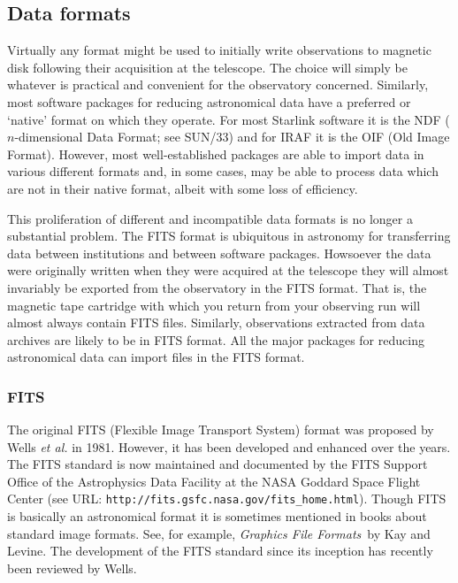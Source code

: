 \documentclass[twoside,11pt]{article}
\newcommand{\htmladdnormallink}[2]{#1}
\newcommand{\xref}[3]{#1}
\newcommand{\xlabel}[1]{}
\begin{document}
\subsection{\label{FORMAT}Data formats}

Virtually any format might be used to initially write observations to
magnetic disk following their acquisition at the telescope.  The choice
will simply be whatever is practical and convenient for the observatory
concerned.  Similarly, most software packages for reducing astronomical
data have a preferred or `native' format on which they operate.  For most
Starlink software it is the NDF ($n$-dimensional Data Format; see
\xref{SUN/33}{sun33}{}\cite{SUN33}) and for IRAF it is the OIF (Old
Image Format).  However, most well-established packages are able to
import data in various different formats and, in some cases, may be able
to process data which are not in their native format, albeit with some loss
of efficiency.

This proliferation of different and incompatible data formats is no longer
a substantial problem.  The FITS format is ubiquitous in astronomy for
transferring data between institutions and between software packages.
Howsoever the data were originally written when they were acquired at the
telescope they will almost invariably be exported from the observatory in
the FITS format.  That is, the magnetic tape cartridge with which you return
from your observing run will almost always contain FITS files.  Similarly,
observations extracted from
\htmladdnormallink{data archives}{http://www.starlink.ac.uk/archives/}
are likely to be in FITS format.  All the major packages for reducing
astronomical data can import files in the FITS format.

\subsubsection{\xlabel{FITS}FITS}

The original FITS (Flexible Image Transport System) format was proposed by
Wells {\it et al.}\/\cite{WELLS81} in 1981.  However, it has been developed
and enhanced over the years.  The FITS standard is now maintained and
documented by the FITS Support Office of the Astrophysics Data Facility at
the NASA Goddard Space Flight Center (see URL:  \newline
\htmladdnormallink{ {\tt http://fits.gsfc.nasa.gov/fits\_home.html}}
{http://fits.gsfc.nasa.gov/fits_home.html}).  Though FITS is
basically an astronomical format it is sometimes mentioned in books about
standard image formats.  See, for example, {\it Graphics File Formats}\, by
Kay and Levine\cite{KAY95}.  The development of the FITS standard since
its inception has recently been reviewed by Wells\cite{WELLS00}.
\end{document}
